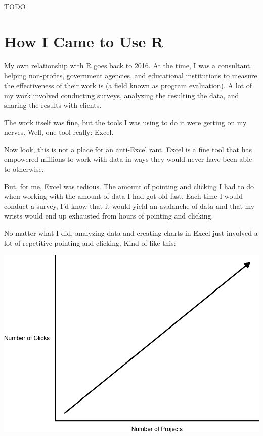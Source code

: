\documentclass[
]{book}
\begin{document}
TODO

\hypertarget{how-i-came-to-use-r}{%
\section*{How I Came to Use R}\label{how-i-came-to-use-r}}

My own relationship with R goes back to 2016. At the time, I was a consultant, helping non-profits, government agencies, and educational institutions to measure the effectiveness of their work is (a field known as \href{https://www.cdc.gov/evaluation/index.htm}{program evaluation}). A lot of my work involved conducting surveys, analyzing the resulting the data, and sharing the results with clients.

The work itself was fine, but the tools I was using to do it were getting on my nerves. Well, one tool really: Excel.

Now look, this is not a place for an anti-Excel rant. Excel is a fine tool that has empowered millions to work with data in ways they would never have been able to otherwise.

But, for me, Excel was tedious. The amount of pointing and clicking I had to do when working with the amount of data I had got old fast. Each time I would conduct a survey, I'd know that it would yield an avalanche of data and that my wrists would end up exhausted from hours of pointing and clicking.

No matter what I did, analyzing data and creating charts in Excel just involved a lot of repetitive pointing and clicking. Kind of like this:

\includegraphics{introduction_files/figure-latex/unnamed-chunk-2-1.pdf}
\end{document}
